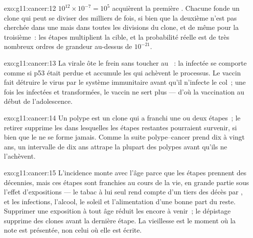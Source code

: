 \begin{solution}{exo:g11:cancer:12}
$10^{12} \times 10^{-7} = 10^5$  acquièrent la première
. Chacune fonde un clone qui peut se diviser des milliers de
fois, si bien que la deuxième  n'est pas cherchée dans une
 mais dans toutes les divisions du clone, et de même pour la
troisième~: les étapes multiplient la cible, et la probabilité réelle
est de très nombreux ordres de grandeur au-dessus de $10^{-21}$.
\end{solution}

\begin{solution}{exo:g11:cancer:13}
La  virale ôte le frein sans toucher au ~: la 
infectée se comporte comme si p53 était perdue et accumule les
 qui achèvent le processus. Le vaccin fait détruire le virus
par le système immunitaire avant qu'il n'infecte le col~; une fois les
 infectées et transformées, le vaccin ne sert plus --- d'où la
vaccination au début de l'adolescence.
\end{solution}

\begin{solution}{exo:g11:cancer:14}
Un polype est un clone qui a franchi une ou deux étapes~; le retirer
supprime les  dans lesquelles les étapes restantes pourraient
survenir, si bien que le  ne se forme jamais. Comme la suite
polype--cancer prend dix à vingt ans, un intervalle de dix ans attrape
la plupart des polypes avant qu'ils ne l'achèvent.
\end{solution}

\begin{solution}{exo:g11:cancer:15}
L'incidence monte avec l'âge parce que les étapes prennent des
décennies, mais ces étapes sont franchies au cours de la vie, en grande
partie sous l'effet d'expositions --- le tabac à lui seul rend compte
d'un tiers des décès par , et les infections, l'alcool, le soleil
et l'alimentation d'une bonne part du reste. Supprimer une exposition à
tout âge réduit les  encore à venir~; le dépistage supprime
des clones avant la dernière étape. La vieillesse est le moment où la
note est présentée, non celui où elle est écrite.
\end{solution}

